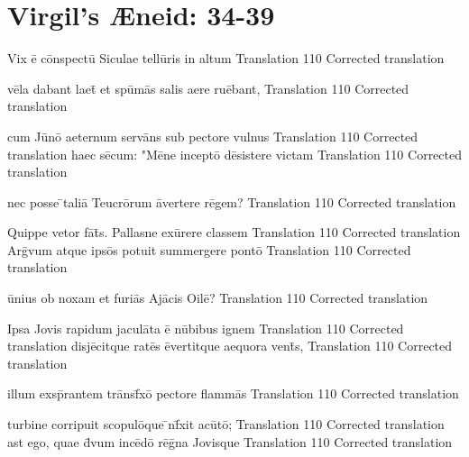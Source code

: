 \documentclass[]{article}
\begin{document}
\section*{Virgil's {\AE}neid:  34-39} %


\latline
  {Vix \={\macron e} c\={\macron o}nspect\={\macron u} Siculae tell\={\macron u}ris in altum }
  {Translation}
  {110} %
  {Corrected translation}
  {
  }

\latline
  {v\={\macron e}la dabant laet\={\macron{\i}} et sp\={\macron u}m\={\macron a}s salis aere ru\={\macron e}bant,}
  {Translation}
  {110} %
  {Corrected translation}
  {
  }

\latline
  {cum J\={\macron u}n\={\macron o} aeternum serv\={\macron a}ns sub pectore vulnus}
  {Translation}
  {110} %
  {Corrected translation}
  {
  }
\newpage
\latline
  {haec s\={\macron e}cum:  "M\={\macron e}ne incept\={\macron o} d\={\macron e}sistere victam}
  {Translation}
  {110} %
  {Corrected translation}
  {
  }

\latline
  {nec posse \={\macron{\i}}tali\={\macron a} Teucr\={\macron o}rum \={\macron a}vertere r\={\macron e}gem?}
  {Translation}
  {110} %
  {Corrected translation}
  {
  }

\latline
  {Quippe vetor f\={\macron a}t\={\macron{\i}}s.  Pallasne ex\={\macron u}rere classem}
  {Translation}
  {110} %
  {Corrected translation}
  {
  }
\newpage
\latline
  {Arg\={\macron{\i}}vum atque ips\={\macron o}s potuit summergere pont\={\macron o}}
  {Translation}
  {110} %
  {Corrected translation}
  {
  }

\latline
  {\={\macron u}nius ob noxam et furi\={\macron a}s Aj\={\macron a}cis Oile\={\macron{\i}}?}
  {Translation}
  {110} %
  {Corrected translation}
  {
  }

\latline
  {Ipsa Jovis rapidum jacul\={\macron a}ta \={\macron e} n\={\macron u}bibus ignem}
  {Translation}
  {110} %
  {Corrected translation}
  {
  }
\newpage
\latline
  {disj\={\macron e}citque rat\={\macron e}s \={\macron e}vertitque aequora vent\={\macron{\i}}s,}
  {Translation}
  {110} %
  {Corrected translation}
  {
  }

\latline
  {illum exsp\={\macron{\i}}rantem tr\={\macron a}nsf\={\macron{\i}}x\={\macron o} pectore flamm\={\macron a}s}
  {Translation}
  {110} %
  {Corrected translation}
  {
  }

\latline
  {turbine corripuit scopul\={\macron o}que \={\macron{\i}}nf\={\macron{\i}}xit ac\={\macron u}t\={\macron o};}
  {Translation}
  {110} %
  {Corrected translation}
  {
  }
\newpage
\latline
  {ast ego, quae d\={\macron{\i}}vum inc\={\macron e}d\={\macron o} r\={\macron e}g\={\macron{\i}}na Jovisque}
  {Translation}
  {110} %
  {Corrected translation}
  {
  }
\end{document}
